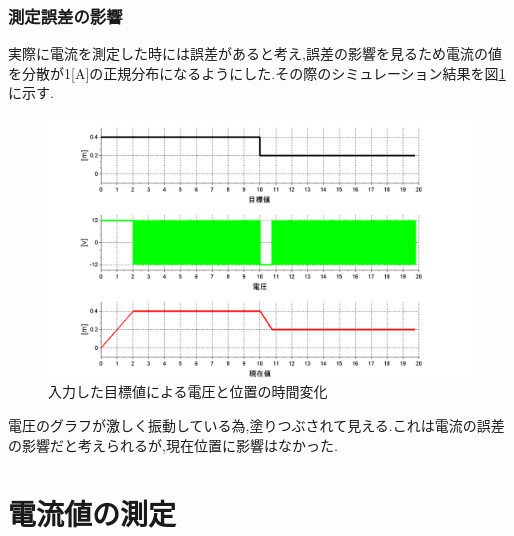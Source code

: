 \subsubsection{測定誤差の影響}
実際に電流を測定した時には誤差があると考え,誤差の影響を見るため電流の値を分散が1[A]の正規分布になるようにした.その際のシミュレーション結果を図\ref{fig:sim}に示す.

\begin{figure}[htbp]
 \begin{center}
    \includegraphics[width=150mm]{img/sim2.bmp}
    \end{center}
  \caption{入力した目標値による電圧と位置の時間変化}
 \label{fig:sim}
\end{figure}

電圧のグラフが激しく振動している為,塗りつぶされて見える.これは電流の誤差の影響だと考えられるが,現在位置に影響はなかった.

\section{電流値の測定}